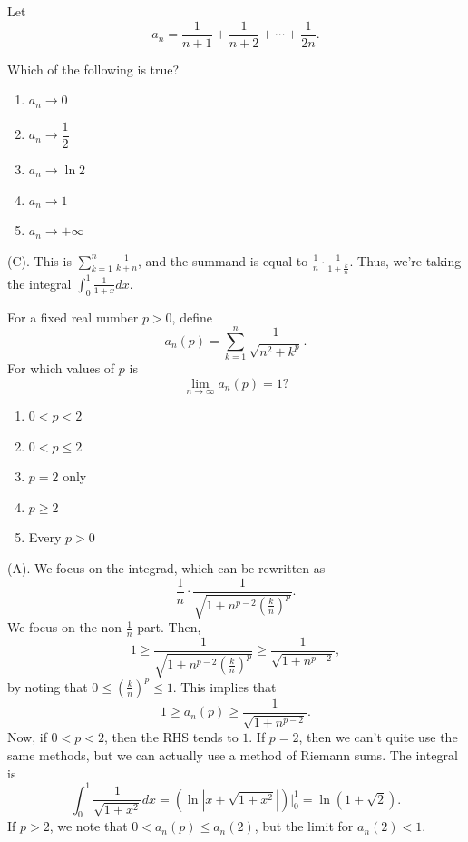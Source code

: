 \begin{exercise}
Let
\[
a_n=\frac{1}{n+1}+\frac{1}{n+2}+\cdots+\frac{1}{2n}.
\]

Which of the following is true?
\begin{enumerate}[label=(\Alph*)]
    \item $a_n\to0$
    \item $a_n\to\dfrac12$
    \item $a_n\to\ln2$
    \item $a_n\to1$
    \item $a_n\to+\infty$
\end{enumerate}
\end{exercise}
\begin{solution}
(C). This is $\sum_{k = 1}^n \frac{1}{k + n}$, and the summand is equal to 
$\frac{1}{n} \cdot \frac{1}{1 + \frac{k}{n}}$. Thus, we're taking the integral 
$\int_0^1 \frac{1}{1+x}dx$.
\end{solution}

\begin{exercise}
For a fixed real number $p>0$, define
\[
a_n(p)=\sum_{k=1}^{n}\frac{1}{\sqrt{n^2+k^p}}.
\]
For which values of $p$ is
\[
\lim_{n\to\infty}a_n(p)=1?
\]
\begin{enumerate}[label=(\Alph*)]
    \item $0<p<2$
    \item $0<p\leq2$
    \item $p=2$ only
    \item $p\geq2$
    \item Every $p>0$
\end{enumerate}
\end{exercise}
\begin{solution}
(A). We focus on the integrad, which can be rewritten as
\[
\frac{1}{n} \cdot \frac{1}{\sqrt{1 + n^{p-2}\left(\frac{k}{n}\right)^{p}}}.
\]
We focus on the non-$\frac{1}{n}$ part. Then, 
\[
1 \geq \frac{1}{\sqrt{1 + n^{p-2}\left(\frac{k}{n}\right)^{p}}} \geq \frac{1}{\sqrt{1 + n^{p - 2}}},
\]
by noting that $0 \leq \left(\frac{k}{n}\right)^{p} \leq 1$.
This implies that 
\[
1 \geq a_n(p) \geq \frac{1}{\sqrt{1 + n^{p - 2}}}.
\]
Now, if $0 < p < 2$, then the RHS tends to $1$. If $p = 2$, then we can't quite 
use the same methods, but we can actually use a method of Riemann sums.
The integral is
\[
\int_0^1 \frac{1}{\sqrt{1 + x^2}} dx =
\left(\ln|x + \sqrt{1 + x^2}|\right)\Bigg|_0^1
= \ln(1 + \sqrt{2}).
\]
If $p > 2$, we note that $0 < a_n(p) \leq a_n(2)$, but the limit for 
$a_n(2) < 1$.
\end{solution}

